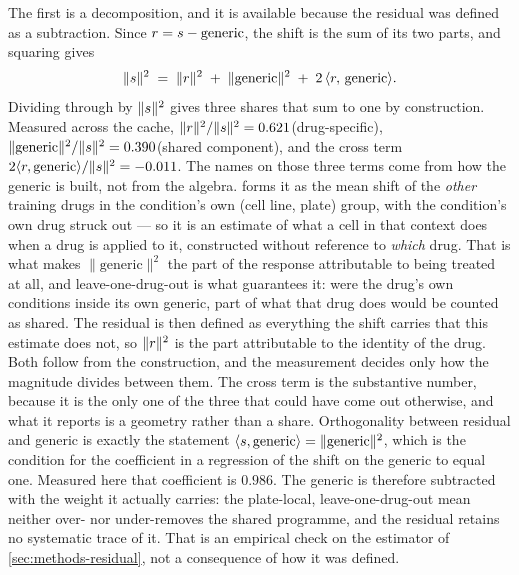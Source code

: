 The first is a decomposition, and it is available because the residual was defined
as a subtraction.  Since $r = s - \textrm{generic}$, the shift is the sum
of its two parts, and squaring gives
\begin{equation}
 \lVert s \rVert^{2}
 \;=\; \lVert r \rVert^{2}
 \;+\; \lVert \textrm{generic} \rVert^{2}
 \;+\; 2\,\langle r,\, \textrm{generic} \rangle .
\end{equation}
Dividing through by $\lVert s \rVert^{2}$ gives three shares that sum to one
by construction. Measured across the cache,
$\lVert r \rVert^{2} / \lVert s \rVert^{2} = 0.621$(drug-specific),
$\lVert \textrm{generic} \rVert^{2} / \lVert s \rVert^{2} = 0.390$(shared component), and the
cross term $2\langle r, \textrm{generic}\rangle / \lVert s \rVert^{2}
= -0.011$. The names on those three terms come from how the generic is built, not from the
algebra.  forms it as the mean shift of the \emph{other}
training drugs in the condition's own (cell line, plate) group, with the
condition's own drug struck out --- so it is an estimate of what a cell in that
context does when a drug is applied to it, constructed without reference to
\emph{which} drug. That is what makes $\lVert \textrm{generic} \rVert^{2}$ the part
of the response attributable to being treated at all, and leave-one-drug-out is
what guarantees it: were the drug's own conditions inside its own generic, part of
what that drug does would be counted as shared. The residual is then defined as
everything the shift carries that this estimate does not, so
$\lVert r \rVert^{2}$ is the part attributable to the identity of the drug. Both follow from the construction, and the measurement
decides only how the magnitude divides between them. 
The cross term is the substantive number, because it is the only one of the three
that could have come out otherwise, and what it reports is a geometry rather than
a share. Orthogonality between residual and generic is exactly the statement
$\langle s, \textrm{generic}\rangle = \lVert \textrm{generic} \rVert^{2}$,
which is the condition for the coefficient in a regression of the shift on the
generic to equal one. Measured here that coefficient is $0.986$. The generic is
therefore subtracted with the weight it actually carries: the plate-local,
leave-one-drug-out mean neither over- nor under-removes the shared programme, and
the residual retains no systematic trace of it. That is an empirical check on the
estimator of \cref{sec:methods-residual}, not a consequence of how it was defined.

